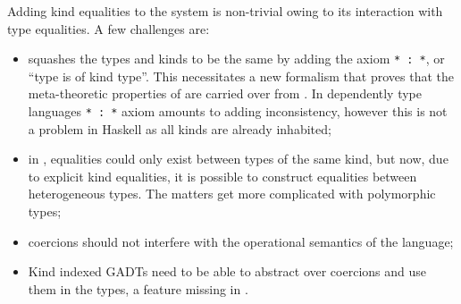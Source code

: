 \documentclass[manuscript,screen,nonacm]{acmart}
\begin{document}
Adding kind equalities to the system is non-trivial owing to its interaction with type equalities. A few challenges are:
\begin{itemize}
 \item \SFK squashes the types and kinds to be the same by adding the axiom \lstinline{* : *}, or ``type is of kind type''. This necessitates a new formalism that proves that the meta-theoretic properties of \SFK are carried over from \SFC. In dependently type languages \lstinline{* : *} axiom amounts to adding inconsistency, however this is not a problem in Haskell as all kinds are already inhabited;
 \item in \SFC, equalities could only exist between types of the same kind, but now, due to explicit kind equalities, it is possible to construct equalities between heterogeneous types. The matters get more complicated with polymorphic types;
 \item coercions should not interfere with the operational semantics of the language;
 \item Kind indexed GADTs need to be able to abstract over coercions and use them in the types, a feature missing in \SFC.
\end{itemize}
\end{document}
